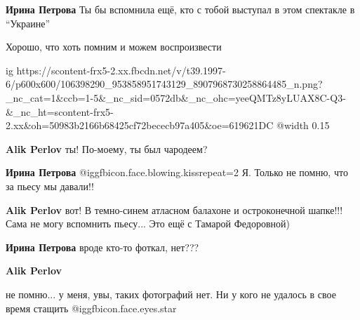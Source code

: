 \textbf{Ирина Петрова} Ты бы вспомнила ещё, кто с тобой выступал в этом спектакле в \enquote{Украине}


Хорошо, что хоть помним и можем воспроизвести

\ifcmt
  ig https://scontent-frx5-2.xx.fbcdn.net/v/t39.1997-6/p600x600/106398290_953858951743129_8907968730258864485_n.png?_nc_cat=1&ccb=1-5&_nc_sid=0572db&_nc_ohc=yeeQMTz8yLUAX8C-Q3-&_nc_ht=scontent-frx5-2.xx&oh=50983b2166b68425cf72bececb97a405&oe=619621DC
  @width 0.15
\fi

\textbf{Alik Perlov} ты! По-моему, ты был чародеем?

\textbf{Ирина Петрова}  @igg{fbicon.face.blowing.kiss}{repeat=2} Я. Только не помню, что за пьесу мы давали!!

\textbf{Alik Perlov} вот! В темно-синем атласном балахоне и остроконечной шапке!!! Сама не могу вспомнить пьесу... Это ещё с Тамарой Федоровной)

\textbf{Ирина Петрова} вроде кто-то фоткал, нет???

\textbf{Alik Perlov} 

не помню... у меня, увы, таких фотографий нет. Ни у кого не удалось в свое
время стащить  @igg{fbicon.face.eyes.star} 
